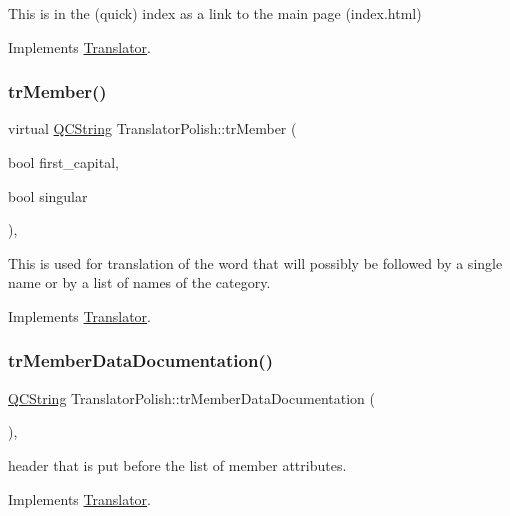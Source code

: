 This is in the (quick) index as a link to the main page (index.\+html) 

Implements \mbox{\hyperlink{class_translator}{Translator}}.

\mbox{\label{class_translator_polish_a9f03af97f82667ea66b8b138426e420b}} 
\subsubsection{\texorpdfstring{trMember()}{trMember()}}
{\footnotesize\ttfamily virtual \mbox{\hyperlink{class_q_c_string}{Q\+C\+String}} Translator\+Polish\+::tr\+Member (\begin{DoxyParamCaption}\item[{bool}]{first\+\_\+capital,  }\item[{bool}]{singular }\end{DoxyParamCaption})\hspace{0.3cm}{\ttfamily [inline]}, {\ttfamily [virtual]}}

This is used for translation of the word that will possibly be followed by a single name or by a list of names of the category. 

Implements \mbox{\hyperlink{class_translator}{Translator}}.

\mbox{\label{class_translator_polish_a5ec821f6b6e87f5a446ef18e492aef23}} 
\subsubsection{\texorpdfstring{trMemberDataDocumentation()}{trMemberDataDocumentation()}}
{\footnotesize\ttfamily \mbox{\hyperlink{class_q_c_string}{Q\+C\+String}} Translator\+Polish\+::tr\+Member\+Data\+Documentation (\begin{DoxyParamCaption}{ }\end{DoxyParamCaption})\hspace{0.3cm}{\ttfamily [inline]}, {\ttfamily [virtual]}}

header that is put before the list of member attributes. 

Implements \mbox{\hyperlink{class_translator}{Translator}}.

